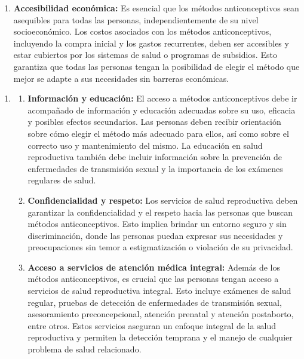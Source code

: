 \documentclass[8pt,a4paper]{beamer}
\begin{document}
{\begin{frame}{}
\begin{block}{}
\begin{enumerate}
\begin{enumerate}
\item[\ding{65}] \textbf{Accesibilidad económica:} Es esencial que los métodos anticonceptivos sean asequibles para todas las personas, independientemente de su nivel socioeconómico. Los costos asociados con los métodos anticonceptivos, incluyendo la compra inicial y los gastos recurrentes, deben ser accesibles y estar cubiertos por los sistemas de salud o programas de subsidios. Esto garantiza que todas las personas tengan la posibilidad de elegir el método que mejor se adapte a sus necesidades sin barreras económicas.

\end{enumerate}
\end{enumerate}
\end{block}
\end{frame}


\begin{frame}{}
\begin{block}{}
\setlength{\parskip}{3px}
\justifying
\begin{enumerate}
\setlength{\parskip}{3px}
\justifying
\item[{}] 
\begin{enumerate}
\setlength{\parskip}{3px}
\justifying
\item[\ding{65}] \textbf{Información y educación:} El acceso a métodos anticonceptivos debe ir acompañado de información y educación adecuadas sobre su uso, eficacia y posibles efectos secundarios. Las personas deben recibir orientación sobre cómo elegir el método más adecuado para ellos, así como sobre el correcto uso y mantenimiento del mismo. La educación en salud reproductiva también debe incluir información sobre la prevención de enfermedades de transmisión sexual y la importancia de los exámenes regulares de salud.

\item[\ding{65}] \textbf{Confidencialidad y respeto:} Los servicios de salud reproductiva deben garantizar la confidencialidad y el respeto hacia las personas que buscan métodos anticonceptivos. Esto implica brindar un entorno seguro y sin discriminación, donde las personas puedan expresar sus necesidades y preocupaciones sin temor a estigmatización o violación de su privacidad.

\item[\ding{65}] \textbf{Acceso a servicios de atención médica integral:} Además de los métodos anticonceptivos, es crucial que las personas tengan acceso a servicios de salud reproductiva integral. Esto incluye exámenes de salud regular, pruebas de detección de enfermedades de transmisión sexual, asesoramiento preconcepcional, atención prenatal y atención postaborto, entre otros. Estos servicios aseguran un enfoque integral de la salud reproductiva y permiten la detección temprana y el manejo de cualquier problema de salud relacionado.
\end{enumerate}


\end{enumerate}
\end{block}
\end{frame}}
\end{document}

